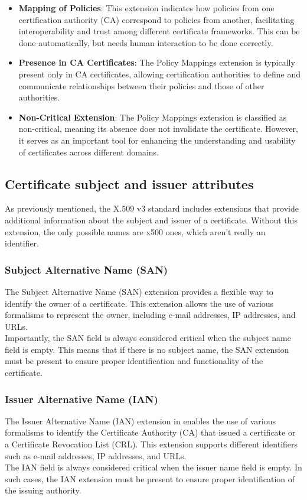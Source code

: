 \begin{itemize}
  \item \textbf{Mapping of Policies}: This extension indicates how
    policies from one certification authority (CA) correspond to
    policies from another, facilitating interoperability and trust
    among different certificate frameworks. This can be done
    automatically, but needs human interaction to be done correctly.

  \item \textbf{Presence in CA Certificates}: The Policy Mappings
    extension is typically present only in CA certificates, allowing
    certification authorities to define and communicate
    relationships between their policies and those of other
    authorities.

  \item \textbf{Non-Critical Extension}: The Policy Mappings
    extension is classified as non-critical, meaning its absence
    does not invalidate the certificate. However, it serves as an
    important tool for enhancing the understanding and usability of
    certificates across different domains.
\end{itemize}

\subsection{Certificate subject and issuer attributes}
As previously mentioned, the X.509 v3 standard includes extensions 
that provide additional information about the subject and issuer of a 
certificate. Without this extension, the only possible names are x500
ones, which aren't really an identifier.
\subsubsection{Subject Alternative Name (SAN)}
The Subject Alternative Name (SAN) extension provides a flexible way
to identify the owner of a certificate. This extension allows the use
of various formalisms to represent the owner, including e-mail
addresses, IP addresses, and URLs.\\
Importantly, the SAN field is always considered critical when the
subject name field is empty. This means that if there is no subject
name, the SAN extension must be present to ensure proper identification
and functionality of the certificate.

\subsubsection{Issuer Alternative Name (IAN)}
The Issuer Alternative Name (IAN) extension in enables the use of
various formalisms to identify the Certificate Authority (CA) that
issued a certificate or a Certificate Revocation List (CRL). This
extension supports different identifiers such as e-mail addresses, IP
addresses, and URLs.\\
The IAN field is always considered critical when the issuer name field 
is empty. In such cases, the IAN extension must be present to ensure 
proper identification of the issuing authority.\\

